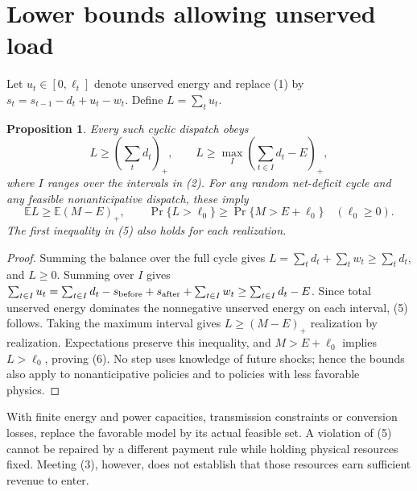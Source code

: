 \documentclass[11pt]{article}
\newtheorem{proposition}[theorem]{Proposition}
\newcommand{\E}{\mathbb E}
\begin{document}
\section{Lower bounds allowing unserved load}
Let $u_t\in[0,\ell_t]$ denote unserved energy and replace (1) by
$s_t=s_{t-1}-d_t+u_t-w_t$. Define $L=\sum_tu_t$.
\begin{proposition}\label{loss}
Every such cyclic dispatch obeys
\[
 L\geq\left(\sum_td_t\right)_+,
 \qquad
 L\geq\max_I\left(\sum_{t\in I}d_t-E\right)_+,                \tag{5}
\]
where $I$ ranges over the intervals in (2). For any random net-deficit
cycle and any feasible nonanticipative dispatch, these imply
\[
 \E L\geq\E(M-E)_+,
 \qquad \Pr\{L>\ell_0\}\geq\Pr\{M>E+\ell_0\}\quad(\ell_0\geq0).
                                                                    \tag{6}
\]
The first inequality in (5) also holds for each realization.
\end{proposition}
\begin{proof}
Summing the balance over the full cycle gives
$L=\sum_td_t+\sum_tw_t\geq\sum_td_t$, and $L\geq0$.
Summing over $I$ gives
$\sum_{t\in I}u_t=\sum_{t\in I}d_t-s_{\rm before}
+s_{\rm after}+\sum_{t\in I}w_t\geq\sum_{t\in I}d_t-E$.
Since total unserved energy dominates the nonnegative unserved energy
on each interval, (5) follows. Taking the maximum interval gives
$L\geq(M-E)_+$ realization by realization. Expectations preserve this
inequality, and $M>E+\ell_0$ implies $L>\ell_0$, proving (6).
No step uses knowledge of future shocks; hence the bounds also apply
to nonanticipative policies and to policies with less favorable physics.
\end{proof}
With finite energy and power capacities, transmission constraints or
conversion losses, replace the favorable model by its actual feasible set.
A violation of (5) cannot be repaired by a different payment rule while
holding physical resources fixed. Meeting (3), however, does not establish
that those resources earn sufficient revenue to enter.
\end{document}

